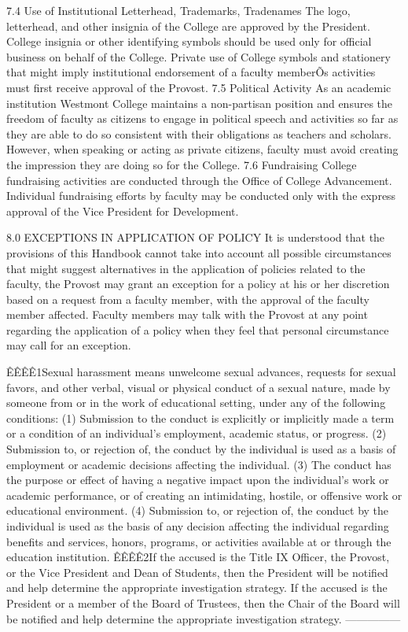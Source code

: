\documentclass[letterpaper, 11pt]{article}
\begin{document}
	7.4 Use of Institutional Letterhead, Trademarks, Tradenames
	The logo, letterhead, and other insignia of the College are approved by the President.  College insignia or other identifying symbols should be used only for official business on behalf of the College.  Private use of College symbols and stationery that might imply institutional endorsement of a faculty memberÕs activities must first receive approval of the Provost.
	7.5 Political Activity
	As an academic institution Westmont College maintains a non-partisan position and ensures the freedom of faculty as citizens to engage in political speech and activities so far as they are able to do so consistent with their obligations as teachers and scholars.  However, when speaking or acting as private citizens, faculty must avoid creating the impression they are doing so for the College.
	7.6 Fundraising
	College fundraising activities are conducted through the Office of College Advancement.  Individual fundraising efforts by faculty may be conducted only with the express approval of the Vice President for Development.

	8.0 EXCEPTIONS IN APPLICATION OF POLICY
	It is understood that the provisions of this Handbook cannot take into account all possible circumstances that might suggest alternatives in the application of policies related to the faculty, the Provost may grant an exception for a policy at his or her discretion based on a request from a faculty member, with the approval of the faculty member affected.  Faculty members may talk with the Provost at any point regarding the application of a policy when they feel that personal circumstance may call for an exception.





	ÊÊÊÊ1Sexual harassment means unwelcome sexual advances, requests for sexual favors, and other verbal, visual or physical conduct of a sexual nature, made by someone from or in the work of educational setting, under any of the following conditions:
	(1)  Submission to the conduct is explicitly or implicitly made a term or a condition of an individual's employment, academic status, or progress.
	(2)  Submission to, or rejection of, the conduct by the individual is used as a basis of employment or academic decisions affecting the individual.
	(3)  The conduct has the purpose or effect of having a negative impact upon the individual's work or academic performance, or of creating an intimidating, hostile, or offensive work or educational environment.
	(4)  Submission to, or rejection of, the conduct by the individual is used as the basis of any decision affecting the individual regarding benefits and services, honors, programs, or activities available at or through the education institution.
	ÊÊÊÊ2If the accused is the Title IX Officer, the Provost, or the Vice President and Dean of Students, then the President will be notified and help determine the appropriate investigation strategy.  If the accused is the President or a member of the Board of Trustees, then the Chair of the Board will be notified and help determine the appropriate investigation strategy.
	---------------
\end{document}
